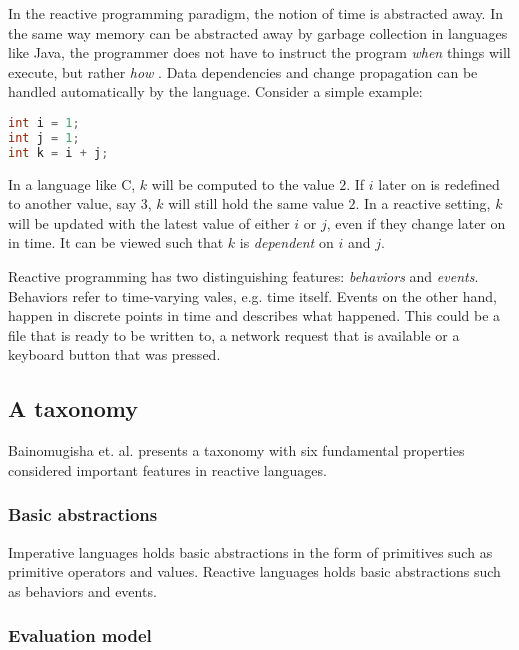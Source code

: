 In the reactive programming paradigm, the notion of time is abstracted away. In
the same way memory can be abstracted away by garbage collection in languages
like Java, the programmer does not have to instruct the program \textit{when}
things will execute, but rather \textit{how} \cite{bainomugisha2013survey}.
Data dependencies and change propagation can be handled automatically by the
language. Consider a simple example:

\begin{lstlisting}[language=C]
int i = 1;
int j = 1;
int k = i + j;
\end{lstlisting}

In a language like C, $k$ will be computed to the value $2$. If $i$ later on is
redefined to another value, say $3$, $k$ will still hold the same value $2$. In
a reactive setting, $k$ will be updated with the latest value of either $i$ or
$j$, even if they change later on in time. It can be viewed such that $k$ is
\textit{dependent} on $i$ and $j$. \cite{bainomugisha2013survey}

Reactive programming has two distinguishing features: \textit{behaviors} and
\textit{events}. Behaviors refer to time-varying vales, e.g. time itself.
Events on the other hand, happen in discrete points in time and describes what
happened. This could be a file that is ready to be written to, a network
request that is available or a keyboard button that was pressed.
\cite{bainomugisha2013survey}

\subsection{A taxonomy}

Bainomugisha et. al. \cite{bainomugisha2013survey} presents a taxonomy with six
fundamental properties considered important features in reactive languages.

\subsubsection{Basic abstractions}

Imperative languages holds basic abstractions in the form of primitives such as
primitive operators and values. Reactive languages holds basic abstractions
such as behaviors and events.

\subsubsection{Evaluation model}
\label{sec:evaluation-model}

